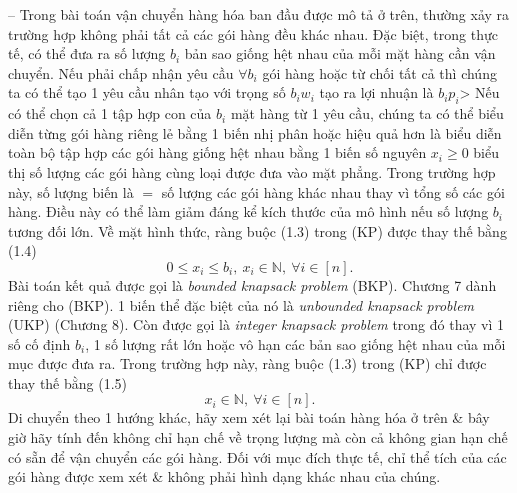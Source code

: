 \documentclass{article}
\begin{document}
\begin{itemize}
\begin{itemize}
        -- Trong bài toán vận chuyển hàng hóa ban đầu được mô tả ở trên, thường xảy ra trường hợp không phải tất cả các gói hàng đều khác nhau. Đặc biệt, trong thực tế, có thể đưa ra số lượng $b_i$ bản sao giống hệt nhau của mỗi mặt hàng cần vận chuyển. Nếu phải chấp nhận yêu cầu $\forall b_i$ gói hàng hoặc từ chối tất cả thì chúng ta có thể tạo 1 yêu cầu nhân tạo với trọng số $b_iw_i$ tạo ra lợi nhuận là $b_ip_i$> Nếu có thể chọn cả 1 tập hợp con của $b_i$ mặt hàng từ 1 yêu cầu, chúng ta có thể biểu diễn từng gói hàng riêng lẻ bằng 1 biến nhị phân hoặc hiệu quả hơn là biểu diễn toàn bộ tập hợp các gói hàng giống hệt nhau bằng 1 biến số nguyên $x_i\ge0$ biểu thị số lượng các gói hàng cùng loại được đưa vào mặt phẳng. Trong trường hợp này, số lượng biến là $=$ số lượng các gói hàng khác nhau thay vì tổng số các gói hàng. Điều này có thể làm giảm đáng kể kích thước của mô hình nếu số lượng $b_i$ tương đối lớn. Về mặt hình thức, ràng buộc (1.3) trong (KP) được thay thế bằng (1.4)
        \begin{equation*}
            0\le x_i\le b_i,\ x_i\in\mathbb{N},\ \forall i\in[n].
        \end{equation*}
        Bài toán kết quả được gọi là {\it bounded knapsack problem} (BKP). Chương 7 dành riêng cho (BKP). 1 biến thể đặc biệt của nó là {\it unbounded knapsack problem} (UKP) (Chương 8). Còn được gọi là {\it integer knapsack problem} trong đó thay vì 1 số cố định $b_i$, 1 số lượng rất lớn hoặc vô hạn các bản sao giống hệt nhau của mỗi mục được đưa ra. Trong trường hợp này, ràng buộc (1.3) trong (KP) chỉ được thay thế bằng (1.5)
        \begin{equation*}
            x_i\in\mathbb{N},\ \forall i\in[n].
        \end{equation*}
        Di chuyển theo 1 hướng khác, hãy xem xét lại bài toán hàng hóa ở trên \& bây giờ hãy tính đến không chỉ hạn chế về trọng lượng mà còn cả không gian hạn chế có sẵn để vận chuyển các gói hàng. Đối với mục đích thực tế, chỉ thể tích của các gói hàng được xem xét \& không phải hình dạng khác nhau của chúng.


\end{itemize}
\end{itemize}
\end{document}

